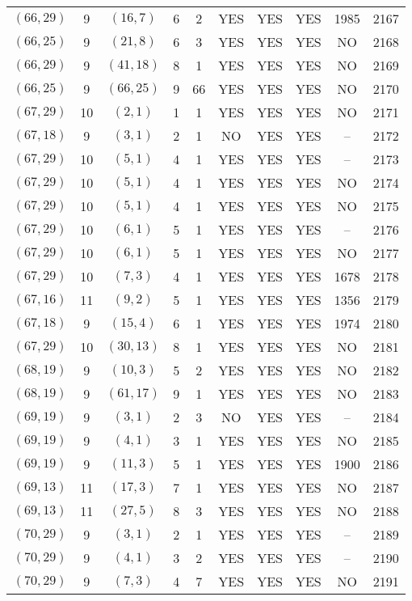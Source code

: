 \begin{longtable}{|c|c|c|c|c|c|c|c|c|c|}
$(66, 29)$ & 9 & $(16, 7)$ & 6 & 2 & YES & YES & YES & 1985 & 2167\\
$(66, 25)$ & 9 & $(21, 8)$ & 6 & 3 & YES & YES & YES & NO & 2168\\
$(66, 29)$ & 9 & $(41, 18)$ & 8 & 1 & YES & YES & YES & NO & 2169\\
$(66, 25)$ & 9 & $(66, 25)$ & 9 & 66 & YES & YES & YES & NO & 2170\\
$(67, 29)$ & 10 & $(2, 1)$ & 1 & 1 & YES & YES & YES & NO & 2171\\
$(67, 18)$ & 9 & $(3, 1)$ & 2 & 1 & NO & YES & YES & -- & 2172\\
$(67, 29)$ & 10 & $(5, 1)$ & 4 & 1 & YES & YES & YES & -- & 2173\\
$(67, 29)$ & 10 & $(5, 1)$ & 4 & 1 & YES & YES & YES & NO & 2174\\
$(67, 29)$ & 10 & $(5, 1)$ & 4 & 1 & YES & YES & YES & NO & 2175\\
$(67, 29)$ & 10 & $(6, 1)$ & 5 & 1 & YES & YES & YES & -- & 2176\\
$(67, 29)$ & 10 & $(6, 1)$ & 5 & 1 & YES & YES & YES & NO & 2177\\
$(67, 29)$ & 10 & $(7, 3)$ & 4 & 1 & YES & YES & YES & 1678 & 2178\\
$(67, 16)$ & 11 & $(9, 2)$ & 5 & 1 & YES & YES & YES & 1356 & 2179\\
$(67, 18)$ & 9 & $(15, 4)$ & 6 & 1 & YES & YES & YES & 1974 & 2180\\
$(67, 29)$ & 10 & $(30, 13)$ & 8 & 1 & YES & YES & YES & NO & 2181\\
$(68, 19)$ & 9 & $(10, 3)$ & 5 & 2 & YES & YES & YES & NO & 2182\\
$(68, 19)$ & 9 & $(61, 17)$ & 9 & 1 & YES & YES & YES & NO & 2183\\
$(69, 19)$ & 9 & $(3, 1)$ & 2 & 3 & NO & YES & YES & -- & 2184\\
$(69, 19)$ & 9 & $(4, 1)$ & 3 & 1 & YES & YES & YES & NO & 2185\\
$(69, 19)$ & 9 & $(11, 3)$ & 5 & 1 & YES & YES & YES & 1900 & 2186\\
$(69, 13)$ & 11 & $(17, 3)$ & 7 & 1 & YES & YES & YES & NO & 2187\\
$(69, 13)$ & 11 & $(27, 5)$ & 8 & 3 & YES & YES & YES & NO & 2188\\
$(70, 29)$ & 9 & $(3, 1)$ & 2 & 1 & YES & YES & YES & -- & 2189\\
$(70, 29)$ & 9 & $(4, 1)$ & 3 & 2 & YES & YES & YES & -- & 2190\\
$(70, 29)$ & 9 & $(7, 3)$ & 4 & 7 & YES & YES & YES & NO & 2191\\

\end{longtable}
